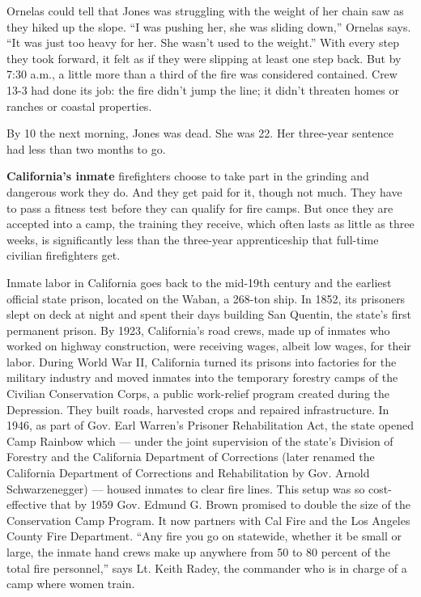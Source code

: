 Ornelas could tell that Jones was struggling with the weight of her
chain saw as they hiked up the slope. ``I was pushing her, she was
sliding down,'' Ornelas says. ``It was just too heavy for her. She
wasn't used to the weight.'' With every step they took forward, it felt
as if they were slipping at least one step back. But by 7:30 a.m., a
little more than a third of the fire was considered contained. Crew 13-3
had done its job: the fire didn't jump the line; it didn't threaten
homes or ranches or coastal properties.

By 10 the next morning, Jones was dead. She was 22. Her three-year
sentence had less than two months to go.

\textbf{California's inmate} firefighters choose to take part in the
grinding and dangerous work they do. And they get paid for it, though
not much. They have to pass a fitness test before they can qualify for
fire camps. But once they are accepted into a camp, the training they
receive, which often lasts as little as three weeks, is significantly
less than the three-year apprenticeship that full-time civilian
firefighters get.

Inmate labor in California goes back to the mid-19th century and the
earliest official state prison, located on the Waban, a 268-ton ship. In
1852, its prisoners slept on deck at night and spent their days building
San Quentin, the state's first permanent prison. By 1923, California's
road crews, made up of inmates who worked on highway construction, were
receiving wages, albeit low wages, for their labor. During World War II,
California turned its prisons into factories for the military industry
and moved inmates into the temporary forestry camps of the Civilian
Conservation Corps, a public work-relief program created during the
Depression. They built roads, harvested crops and repaired
infrastructure. In 1946, as part of Gov. Earl Warren's Prisoner
Rehabilitation Act, the state opened Camp Rainbow which --- under the
joint supervision of the state's Division of Forestry and the California
Department of Corrections (later renamed the California Department of
Corrections and Rehabilitation by Gov. Arnold Schwarzenegger) --- housed
inmates to clear fire lines. This setup was so cost-effective that by
1959 Gov. Edmund G. Brown promised to double the size of the
Conservation Camp Program. It now partners with Cal Fire and the Los
Angeles County Fire Department. ``Any fire you go on statewide, whether
it be small or large, the inmate hand crews make up anywhere from 50 to
80 percent of the total fire personnel,'' says Lt. Keith Radey, the
commander who is in charge of a camp where women train.

